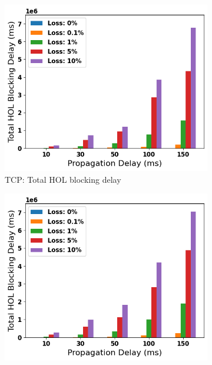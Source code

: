\documentclass{mpaper}
\begin{document}
\begin{figure}
  \centering
  \begin{subfigure}[b]{0.32\textwidth}
      \centering
      \includegraphics[width=\textwidth]{Total_HOL_Blocking/TCP_Total_HOL_delay.png}
      \caption{TCP: Total HOL blocking delay}
      \label{fig:TCP_HOL_TOTAL}
  \end{subfigure}
  \hfill
  \begin{subfigure}[b]{0.32\textwidth}
      \centering
      \includegraphics[width=\textwidth]{Total_HOL_Blocking/QUIC_SS_Total_HOL_delay.png}

\end{subfigure}
\end{figure}
\end{document}
